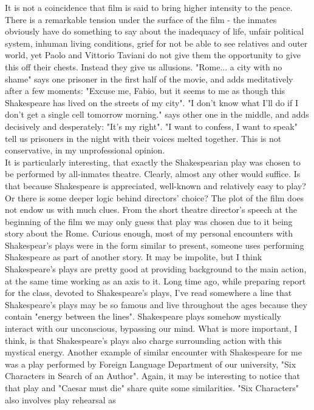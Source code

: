 \documentclass[10pt]{article}
\begin{document}
It is not a coincidence that film is said to bring higher intensity to the peace. There is a remarkable tension under the surface of the film - the inmates obviously have do something to say about the inadequacy of life, unfair
political system, inhuman living conditions, grief for not be able to see relatives and outer world, yet Paolo and Vittorio Taviani do not give them the opportunity to give this off their chests. Instead they give us allusions. "Rome...
a city with no shame" says one prisoner in the first half of the movie, and adds meditatively after a few moments: "Excuse me, Fabio, but it seems to me as though this Shakespeare has lived on the streets of my city". 
"I don't know what I'll do if I don't get a single cell tomorrow morning." says other one in the middle, and adds decisively and desperately: "It's my right". "I want to confess, I want to speak" tell us prisoners in the night with
their voices melted together. This is not conservative, in my unprofessional opinion.\\
It is particularly interesting, that exactly the Shakespearian play was chosen to be performed by all-inmates theatre. Clearly, almost any other
would suffice. Is that because Shakespeare is appreciated, well-known and relatively easy to play? Or there is some deeper logic behind directors'
choice? The plot of the film does not endow us with much clues. From the short theatre director's speech at the beginning of the film we may only
guess that play was chosen due to it being story about the Rome. Curious enough, most of my personal encounters with Shakespear's plays were
in the form similar to present, someone uses performing Shakespeare as part of another story. It may be impolite, but I think Shakespeare's plays
are pretty good at providing background to the main action, at the same time working as an axis to it. Long time ago, while preparing report for
the class, devoted to Shakespeare's plays, I've read somewhere a line that Shakespeare's plays may be so famous and live throughout the ages because
they contain "energy between the lines". Shakespeare plays somehow mystically interact with our unconscious, bypassing our mind. What is more
important, I think, is that Shakespeare's plays also charge surrounding action with this mystical energy. Another example of similar encounter
with Shakespeare for me was a play performed by Foreign Language Department of our university, "Six Characters in Search of an Author". Again, it may
be interesting to notice that that play and "Caesar must die" share quite some similarities. "Six Characters" also involves play rehearsal as
\end{document}
